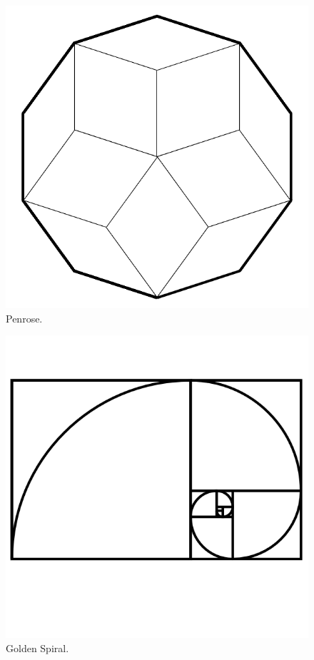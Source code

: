 \documentclass{report}
\begin{document}
\begin{figure}
	\centering
	\includegraphics[width=5in]{imageserver/uploadimages/image7.png}
	\caption{Penrose.}
\end{figure}

\begin{figure}
	\centering
	\includegraphics[width=5in]{imageserver/uploadimages/image18.png}
	\caption{Golden Spiral.}
\end{figure}
\end{document}

